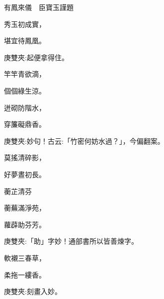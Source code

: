 \begin{poem}
    \begin{pl}有鳳來儀　臣寶玉謹題\end{pl}

    \begin{pl}秀玉初成實，\end{pl}

    \begin{pl}堪宜待鳳凰。\end{pl}\begin{note}庚雙夾:起便拿得住。\end{note}

    \begin{pl}竿竿青欲滴，\end{pl}

    \begin{pl}個個綠生涼。\end{pl}

    \begin{pl}迸砌防階水，\end{pl}

    \begin{pl}穿簾礙鼎香。\end{pl}\begin{note}庚雙夾:妙句！古云:「竹密何妨水過？」，今偏翻案。\end{note}

    \begin{pl}莫搖清碎影，\end{pl}

    \begin{pl}好夢晝初長。\end{pl}

    \begin{pl}蘅芷清芬\end{pl}

    \begin{pl}蘅蕪滿淨苑，\end{pl}

    \begin{pl}蘿薜助芬芳。\end{pl}\begin{note}庚雙夾:「助」字妙！通部書所以皆善煉字。\end{note}

    \begin{pl}軟襯三春草，\end{pl}

    \begin{pl}柔拖一縷香。\end{pl}\begin{note}庚雙夾:刻畫入妙。\end{note}


\end{poem}
